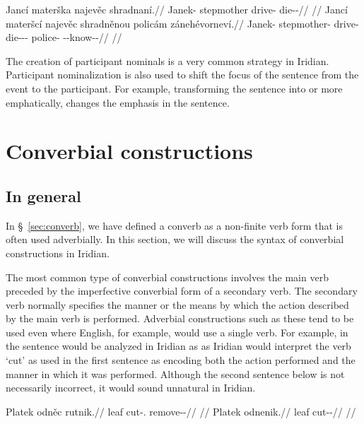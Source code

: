 \pex
\a\begingl
    \gla Jancí materška najevěc shradnaní.//
    \glb Janek-\Gen{} stepmother drive-\Cv{} die-\Pv{}-\Ret{}//
    \glft {}//
\endgl
\a\begingl
    \gla Jancí materšcí najevěc shradněnou policám zánehévorneví.//
    \glb Janek-\Gen{} stepmother-\Gen{} drive-\Cv{} die-\Pv{}-\Ret{}-\Nz{} police-\Agt{} \Neg{}-\Caus{}-know-\Pv{}-\Cont{}//
    \glft {}//
\endgl
\xe

The creation of participant nominals is a very common strategy in Iridian.
Participant nominalization is also used to shift the focus of the sentence from
the event to the participant. For example, transforming the sentence  into  or more
emphatically,  changes the emphasis
in the sentence.

\section{Converbial constructions}\label{converbs-syntax}

\subsection{In general}

In \S~\ref{sec:converb}, we have defined a converb as a non-finite verb form
that is often used adverbially. In this section, we will discuss the syntax of
converbial constructions in Iridian.

The most common type of converbial constructions involves the main verb preceded
by the imperfective converbial form of a secondary verb. The secondary verb
normally specifies the manner or the means by which the action described by the
main verb is performed. Adverbial constructions such as these tend to be used
even where English, for example, would use a single verb. For example, in the
sentence  would be analyzed in Iridian as  as Iridian would interpret the verb `cut' as used
in the first sentence as encoding both the action performed and the manner in
which it was performed. Although the second sentence below is not necessarily
incorrect, it would sound unnatural in Iridian.

\pex
\a\begingl
  \gla Platek odněc rutnik.//
  \glb leaf cut-\Cv{}.\Ipf{} remove-\Pv{}-\Pf{}//
  \glft {}//
\endgl
\a\begingl
  \gla{}Platek odnenik.//
  \glb leaf cut-\Pv{}-\Pf{}//
  \glft {}//
\endgl
\xe


